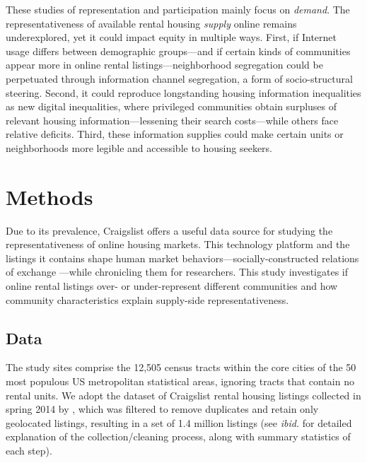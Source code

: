 \documentclass[11pt,letterpaper]{article}
\begin{document}
These studies of representation and participation mainly focus on \emph{demand}. The representativeness of available rental housing \emph{supply} online remains underexplored, yet it could impact equity in multiple ways. First, if Internet usage differs between demographic groups---and if certain kinds of communities appear more in online rental listings---neighborhood segregation could be perpetuated through information channel segregation, a form of socio-structural steering. Second, it could reproduce longstanding housing information inequalities as new digital inequalities, where privileged communities obtain surpluses of relevant housing information---lessening their search costs---while others face relative deficits. Third, these information supplies could make certain units or neighborhoods more legible and accessible to housing seekers.

\section{Methods}

Due to its prevalence, Craigslist offers a useful data source for studying the representativeness of online housing markets. This technology platform and the listings it contains shape human market behaviors---socially-constructed relations of exchange \citep{desmond_heavy_2018,cahill_market_2019}---while chronicling them for researchers. This study investigates if online rental listings over- or under-represent different communities and how community characteristics explain supply-side representativeness.

\subsection{Data}

The study sites comprise the 12,505 census tracts within the core cities of the 50 most populous US metropolitan statistical areas, ignoring tracts that contain no rental units. We adopt the dataset of Craigslist rental housing listings collected in spring 2014 by \citet{boeing_new_2017}, which was filtered to remove duplicates and retain only geolocated listings, resulting in a set of 1.4 million listings (see \textit{ibid.} for detailed explanation of the collection/cleaning process, along with summary statistics of each step).
\end{document}
